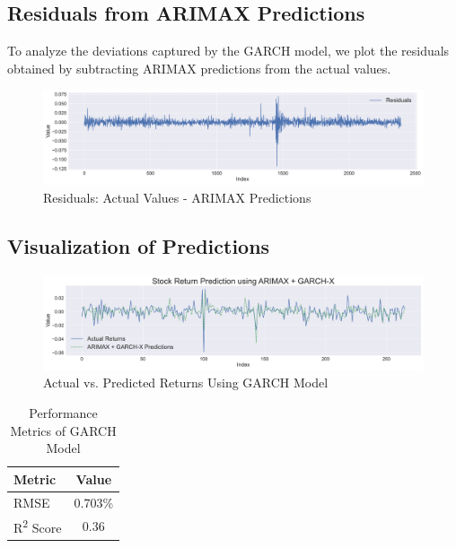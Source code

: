 \subsection{Residuals from ARIMAX Predictions}

To analyze the deviations captured by the GARCH model, we plot the residuals obtained by subtracting ARIMAX predictions from the actual values.

\begin{figure}[h!]
    \centering
    \includegraphics[width=\textwidth]{Images/7_Residuals.pdf}
    \caption{Residuals: Actual Values - ARIMAX Predictions}
    \label{fig:residuals_actual_arimax}
\end{figure}

\subsection{Visualization of Predictions}

\begin{figure}[h!]
    \centering
    \includegraphics[width=\textwidth]{Images/7_garchx_arimax.pdf}
    \caption{Actual vs. Predicted Returns Using GARCH Model}
    \label{fig:garch_actual_pred}
\end{figure}

\begin{table}[h!]
\centering
\caption{Performance Metrics of GARCH Model}
\label{tab:garch_performance}
\begin{tabular}{|l|c|}
\hline
\textbf{Metric}   & \textbf{Value}  \\ \hline
RMSE              & 0.703\%  \\ \hline
R\textsuperscript{2} Score & 0.36  \\ \hline
\end{tabular}
\end{table}

